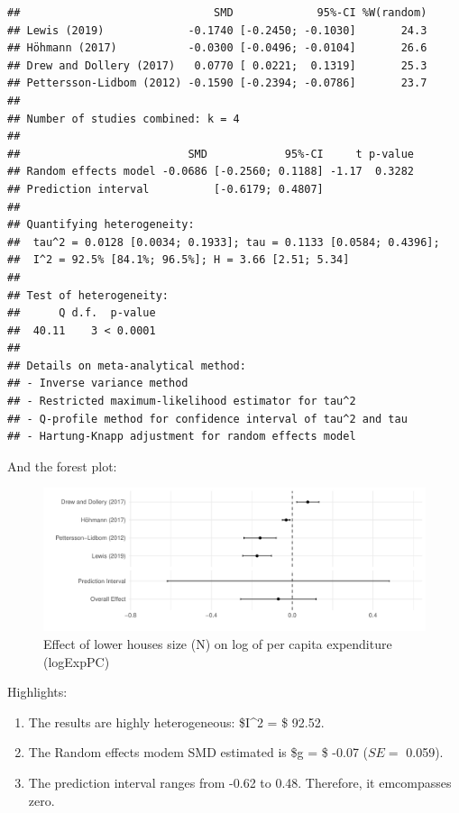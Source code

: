 \documentclass[
]{article}
\providecommand{\tightlist}{%
  \setlength{\itemsep}{0pt}\setlength{\parskip}{0pt}}
\begin{document}
\begin{verbatim}
##                              SMD             95%-CI %W(random)
## Lewis (2019)             -0.1740 [-0.2450; -0.1030]       24.3
## Höhmann (2017)           -0.0300 [-0.0496; -0.0104]       26.6
## Drew and Dollery (2017)   0.0770 [ 0.0221;  0.1319]       25.3
## Pettersson-Lidbom (2012) -0.1590 [-0.2394; -0.0786]       23.7
## 
## Number of studies combined: k = 4
## 
##                          SMD            95%-CI     t p-value
## Random effects model -0.0686 [-0.2560; 0.1188] -1.17  0.3282
## Prediction interval          [-0.6179; 0.4807]              
## 
## Quantifying heterogeneity:
##  tau^2 = 0.0128 [0.0034; 0.1933]; tau = 0.1133 [0.0584; 0.4396];
##  I^2 = 92.5% [84.1%; 96.5%]; H = 3.66 [2.51; 5.34]
## 
## Test of heterogeneity:
##      Q d.f.  p-value
##  40.11    3 < 0.0001
## 
## Details on meta-analytical method:
## - Inverse variance method
## - Restricted maximum-likelihood estimator for tau^2
## - Q-profile method for confidence interval of tau^2 and tau
## - Hartung-Knapp adjustment for random effects model
\end{verbatim}

And the forest plot:

\begin{figure}
\centering
\includegraphics{appendixV5_files/figure-latex/unnamed-chunk-21-1.pdf}
\caption{Effect of lower houses size (N) on log of per capita
expenditure (logExpPC)}
\end{figure}

Highlights:

\begin{enumerate}
\def\labelenumi{\arabic{enumi}.}
\tightlist
\item
  The results are highly heterogeneous: \$I\^{}2 = \$ 92.52.
\item
  The Random effects modem SMD estimated is \$g = \$ -0.07 (\(SE =\)
  0.059).
\item
  The prediction interval ranges from -0.62 to 0.48. Therefore, it
  emcompasses zero.
\end{enumerate}
\end{document}
